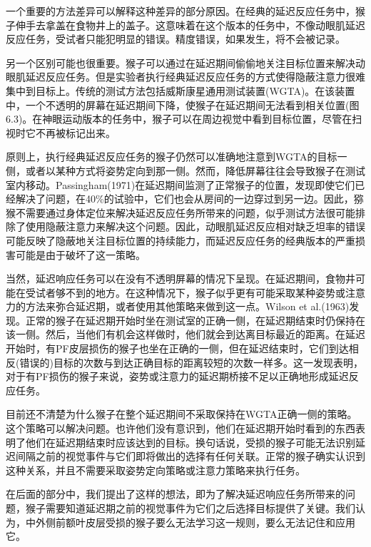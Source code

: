 一个重要的方法差异可以解释这种差异的部分原因。在经典的延迟反应任务中，猴子伸手去拿盖在食物井上的盖子。这意味着在这个版本的任务中，不像动眼肌延迟反应任务，受试者只能犯明显的错误。精度错误，如果发生，将不会被记录。

另一个区别可能也很重要。猴子可以通过在延迟期间偷偷地关注目标位置来解决动眼肌延迟反应任务。但是实验者执行经典延迟反应任务的方式使得隐蔽注意力很难集中到目标上。传统的测试方法包括威斯康星通用测试装置(WGTA)。在该装置中，一个不透明的屏幕在延迟期间下降，使猴子在延迟期间无法看到相关位置(图6.3)。在神眼运动版本的任务中，猴子可以在周边视觉中看到目标位置，尽管在扫视时它不再被标记出来。

原则上，执行经典延迟反应任务的猴子仍然可以准确地注意到WGTA的目标一侧，或者以某种方式将姿势定向到那一侧。然而，降低屏幕往往会导致猴子在测试室内移动。Passingham(1971)在延迟期间监测了正常猴子的位置，发现即使它们已经解决了问题，在40\%的试验中，它们也会从房间的一边穿过到另一边。因此，猕猴不需要通过身体定位来解决延迟反应任务所带来的问题，似乎测试方法很可能排除了使用隐蔽注意力来解决这个问题。因此，动眼肌延迟反应相对缺乏坦率的错误可能反映了隐蔽地关注目标位置的持续能力，而延迟反应任务的经典版本的严重损害可能是由于破坏了这一策略。

当然，延迟响应任务可以在没有不透明屏幕的情况下呈现。在延迟期间，食物井可能在受试者够不到的地方。在这种情况下，猴子似乎更有可能采取某种姿势或注意力的方法来弥合延迟期，或者使用其他策略来做到这一点。Wilson et al.(1963)发现。正常的猴子在延迟期开始时坐在测试室的正确一侧，在延迟期结束时仍保持在该一侧。然后，当他们有机会这样做时，他们就会到达离目标最近的距离。在延迟开始时，有PF皮层损伤的猴子也坐在正确的一侧，但在延迟结束时，它们到达相反(错误的)目标的次数与到达正确目标的距离较短的次数一样多。这一发现表明，对于有PF损伤的猴子来说，姿势或注意力的延迟期桥接不足以正确地形成延迟反应任务。

目前还不清楚为什么猴子在整个延迟期间不采取保持在WGTA正确一侧的策略。这个策略可以解决问题。也许他们没有意识到，他们在延迟期开始时看到的东西表明了他们在延迟期结束时应该达到的目标。换句话说，受损的猴子可能无法识别延迟间隔之前的视觉事件与它们即将做出的选择有任何关联。正常的猴子确实认识到这种关系，并且不需要采取姿势定向策略或注意力策略来执行任务。

在后面的部分中，我们提出了这样的想法，即为了解决延迟响应任务所带来的问题，猴子需要知道延迟期之前的视觉事件为它们之后选择目标提供了关键。我们认为，中外侧前额叶皮层受损的猴子要么无法学习这一规则，要么无法记住和应用它。

